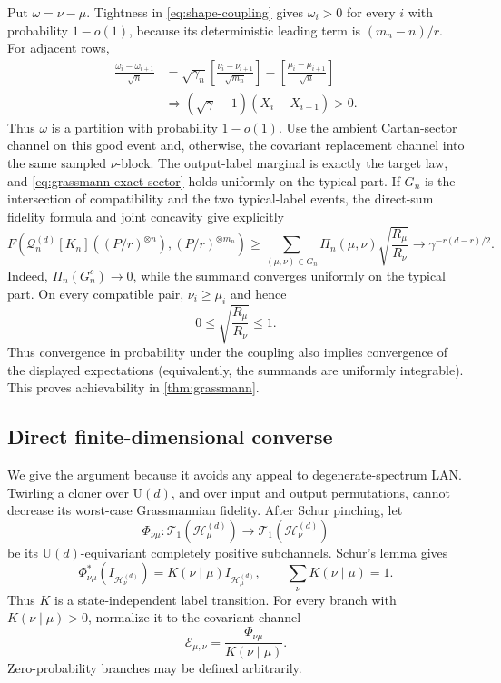 \documentclass[11pt]{article}
\theoremstyle{remark}
\theoremstyle{plain}
\newcommand{\cE}{\mathcal E}
\newcommand{\cH}{\mathcal H}
\newcommand{\cT}{\mathcal T}
\newcommand{\U}{\mathrm U}
\newcommand{\ot}{\otimes}
\begin{document}
Put \(\omega=\nu-\mu\).  Tightness in
\eqref{eq:shape-coupling} gives \(\omega_i>0\) for every \(i\) with
probability \(1-o(1)\), because its deterministic leading term is
\((m_n-n)/r\).  For adjacent rows,
\begin{align*}
  \frac{\omega_i-\omega_{i+1}}{\sqrt n}
  &={\sqrt{\gamma_n}}
    \left[
      \frac{\nu_i-\nu_{i+1}}{\sqrt{m_n}}
    \right]
    -\left[
      \frac{\mu_i-\mu_{i+1}}{\sqrt n}
    \right]\\
  &\Longrightarrow
    (\sqrt\gamma-1)(X_i-X_{i+1})>0.
\end{align*}
Thus \(\omega\) is a partition with probability \(1-o(1)\).  Use the
ambient Cartan-sector channel on this good event and, otherwise, the
covariant replacement channel into the same sampled \(\nu\)-block.  The
output-label marginal is exactly the target law, and
\eqref{eq:grassmann-exact-sector} holds uniformly on the typical part.
If \(G_n\) is the intersection of compatibility and the two typical-label
events, the direct-sum fidelity formula and joint concavity give explicitly
\[
  F\!\left(
    \mathcal Q_n^{(d)}[K_n]((P/r)^{\ot n}),
    (P/r)^{\ot m_n}
  \right)
  \ge
  \sum_{(\mu,\nu)\in G_n}
  \Pi_n(\mu,\nu)\sqrt{\frac{R_\mu}{R_\nu}}
  \longrightarrow\gamma^{-r(d-r)/2}.
\]
Indeed, \(\Pi_n(G_n^c)\to0\), while the summand converges uniformly on the
typical part.  On every compatible pair, \(\nu_i\ge\mu_i\) and hence
\[
  0\le\sqrt{\frac{R_\mu}{R_\nu}}\le1.
\]
Thus convergence in probability under the coupling also implies convergence
of the displayed expectations (equivalently, the summands are uniformly
integrable).  This proves achievability in \cref{thm:grassmann}.

\subsection{Direct finite-dimensional converse}

We give the argument because it avoids any appeal to degenerate-spectrum
LAN.  Twirling a cloner over \(\U(d)\), and over input and output
permutations, cannot decrease its worst-case Grassmannian fidelity.  After
Schur pinching, let
\[
  \Phi_{\nu\mu}:
  \cT_1(\cH_\mu^{(d)})\longrightarrow
  \cT_1(\cH_\nu^{(d)})
\]
be its \(\U(d)\)-equivariant completely positive subchannels.  Schur's
lemma gives
\[
  \Phi_{\nu\mu}^*(I_{\cH_\nu^{(d)}})
  =K(\nu\mid\mu)I_{\cH_\mu^{(d)}},
  \qquad
  \sum_\nu K(\nu\mid\mu)=1.
\]
Thus \(K\) is a state-independent label transition.  For every branch with
\(K(\nu\mid\mu)>0\), normalize it to the covariant channel
\[
  \cE_{\mu,\nu}
  =\frac{\Phi_{\nu\mu}}{K(\nu\mid\mu)}.
\]
Zero-probability branches may be defined arbitrarily.
\end{document}
